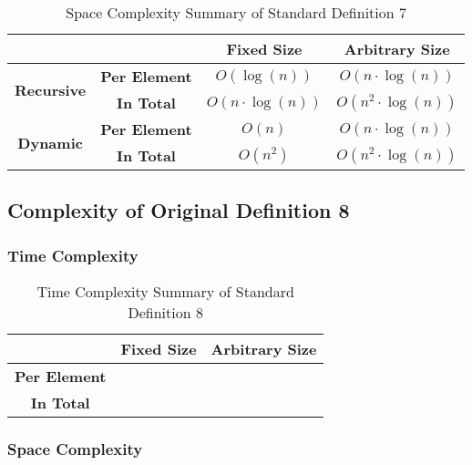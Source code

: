 \documentclass[conference]{IEEEtran}
\begin{document}
\begin{table}[H]
    \centering
    \caption{Space Complexity Summary of Standard Definition 7}
    \begin{tabular}{|cc|c|c|}
        \hline
        & & \textbf{Fixed Size} & \textbf{Arbitrary Size} \\
        \hline
        \multirow{2}{*}{\textbf{Recursive}} \hspace{-5pt} & \textbf{Per Element} & $O(\log(n))$ & $O(n \cdot \log(n))$ \\
        \cline{2-4}
        & \textbf{In Total} & $O(n \cdot \log(n))$ & $O\left(n^2 \cdot \log(n)\right)$ \\
        \hline
        \multirow{2}{*}{\textbf{Dynamic}} \hspace{-5pt} & \textbf{Per Element} & $O(n)$ & $O(n \cdot \log(n))$ \\
        \cline{2-4}
        & \textbf{In Total} & $O\left(n^2\right)$ & $O\left(n^2 \cdot \log(n)\right)$ \\
        \hline
    \end{tabular}
    \label{tab:space_p2_d07}
\end{table}
\renewcommand{\arraystretch}{1}

\subsection{Complexity of Original Definition 8}
\label{ca:p2_d08}

\subsubsection{Time Complexity}

\begin{table}[H]
    \centering
    \caption{Time Complexity Summary of Standard Definition 8}
    \begin{tabular}{|c|c|c|}
        \hline
        & \textbf{Fixed Size} & \textbf{Arbitrary Size} \\
        \hline
        \textbf{Per Element} &  &  \\
        \hline
        \textbf{In Total} &  &  \\
        \hline
    \end{tabular}
    \label{tab:time_p2_d08}
\end{table}

\subsubsection{Space Complexity}
\end{document}
